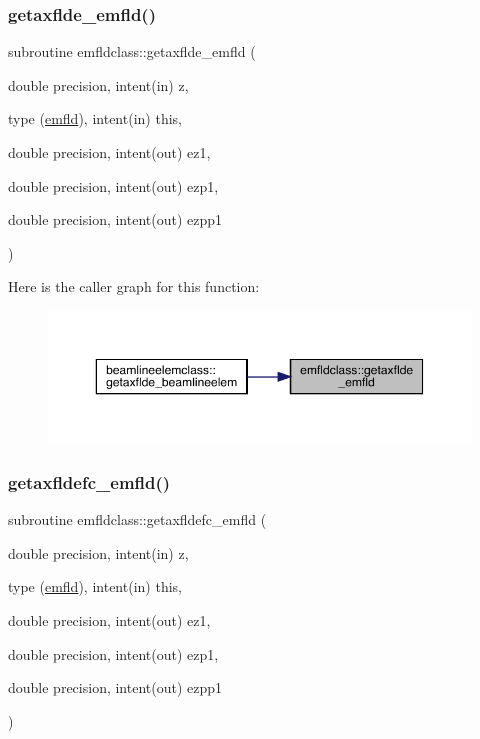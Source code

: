 \mbox{\label{namespaceemfldclass_a2b0b3e7b6537f3a6ea857f99288186ef}} 
\subsubsection{\texorpdfstring{getaxflde\_emfld()}{getaxflde\_emfld()}}
{\footnotesize\ttfamily subroutine emfldclass\+::getaxflde\+\_\+emfld (\begin{DoxyParamCaption}\item[{double precision, intent(in)}]{z,  }\item[{type (\mbox{\hyperlink{namespaceemfldclass_structemfldclass_1_1emfld}{emfld}}), intent(in)}]{this,  }\item[{double precision, intent(out)}]{ez1,  }\item[{double precision, intent(out)}]{ezp1,  }\item[{double precision, intent(out)}]{ezpp1 }\end{DoxyParamCaption})}

Here is the caller graph for this function\+:\nopagebreak
\begin{figure}[H]
\begin{center}
\leavevmode
\includegraphics[width=350pt]{namespaceemfldclass_a2b0b3e7b6537f3a6ea857f99288186ef_icgraph}
\end{center}
\end{figure}
\mbox{\label{namespaceemfldclass_ae77f42a7f667c3dd902df1d26480e602}} 
\subsubsection{\texorpdfstring{getaxfldefc\_emfld()}{getaxfldefc\_emfld()}}
{\footnotesize\ttfamily subroutine emfldclass\+::getaxfldefc\+\_\+emfld (\begin{DoxyParamCaption}\item[{double precision, intent(in)}]{z,  }\item[{type (\mbox{\hyperlink{namespaceemfldclass_structemfldclass_1_1emfld}{emfld}}), intent(in)}]{this,  }\item[{double precision, intent(out)}]{ez1,  }\item[{double precision, intent(out)}]{ezp1,  }\item[{double precision, intent(out)}]{ezpp1 }\end{DoxyParamCaption})}

